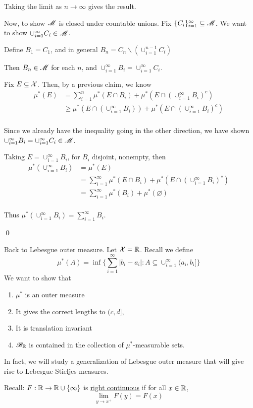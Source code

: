 \documentclass[x11names,reqno,14pt]{extarticle}
\newcommand*{\oo}{\infty}
\newcommand{\seq}[1]{_{#1 = 1}^\oo}
\begin{document}
Taking the limit as $n\to\oo$ gives the result. 

Now, to show $\mathscr{M}$ is closed under countable unions. Fix $\{C_i\}\seq{i}\subseteq\ms{M}$. We want to show $\cup\seq{i}C_i\in\ms{M}$. 

Define $B_1 = C_1$, and in general $B_n = C_n \backslash (\cup_{i=1}^{n - 1}C_i)$

Then $B_n \in \mathscr{M}$ for each $n$, and $\cup\seq{i}B_i = \cup\seq{i}C_i$. 

Fix $E\subseteq \mathcal{X}$. Then, by a previous claim, we know 
\begin{align*}
\mu^*(E) & = \sum_{i=1}^n\mu^*(E\cap B_i) + \mu^*(E\cap(\cup\seq{i}B_i)^c) \\
			& \geq \mu^*(E\cap(\cup\seq{i}B_i)) + \mu^*(E\cap(\cup\seq{i}B_i)^c) \\
\end{align*}

Since we already have the inequality going in the other direction, we have shown $\cup\seq{i}B_i=\cup\seq{i}C_i \in \ms{M}$. 

Taking $E = \cup\seq{i}B_i$, for $B_i$ disjoint, nonempty, then 
\begin{align*}
\mu^*(\cup\seq{i}B_i) & = \mu^*(E) \\
							  & = \sum\seq{i}\mu^*(E\cap B_i) + \mu^*(E\cap(\cup\seq{i}B_i)^c) \\
							  & = \sum\seq{i}\mu^*(B_i) + \mu^*(\varnothing) \\
\end{align*}

Thus $\mu^*(\cup\seq{i}B_i) = \sum\seq{i}B_i$. 

\qed

Back to Lebesgue outer measure. Let $\mathcal{X} = \mathbb{R}$. Recall we define 
\[
\mu^*(A) = \inf\{\sum\seq{i}|b_i-a_i|:A\subseteq\cup\seq{i}(a_i, b_i]\}
\]
We want to show that
\begin{enumerate}
\item $\mu^*$ is an outer measure
\item It gives the correct lengths to $(c, d]$, 
\item It is translation invariant
\item $\mathscr{B}_{\mathbb{R}}$ is contained in the collection of $\mu^*$-measurable sets. 
\end{enumerate}

In fact, we will study a generalization of Lebesgue outer measure that will give rise to Lebesgue-Stieljes measures. 

Recall: $F:\R\to\R\cup\{\oo\}$ is \underline{right continuous} if for all $x \in \mathbb{R}$, 
\[
\lim_{y\to x^+}F(y) = F(x)
\]
\end{document}
